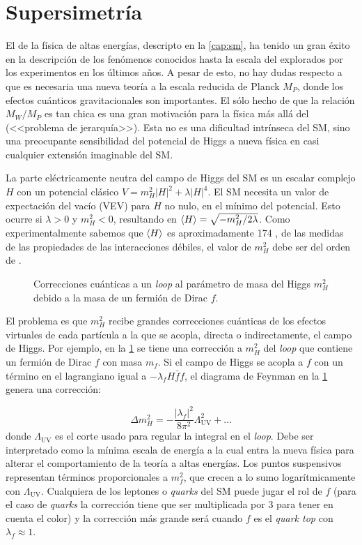 \section{Supersimetría}
\label{cap:susy}

El {\SM} de la física de altas energías, descripto en la \cref{cap:sm}, ha
tenido un gran éxito en la descripción de los fenómenos conocidos hasta la
escala del {\tev} explorados por los experimentos en los últimos a\~nos. A pesar
de esto, no hay dudas respecto a que es necesaria una nueva teoría a la escala
reducida de Planck $M_P$, donde los efectos cuánticos gravitacionales son
importantes. El sólo hecho de que la relación $M_W/M_P$ es tan chica es una
gran motivación para la física más allá del {\SM} (<<problema de jerarquía>>).
Esta no es una dificultad intrínseca del SM, sino una
preocupante sensibilidad del potencial de Higgs a nueva física en casi cualquier
extensión imaginable del SM.

La parte eléctricamente neutra del campo de Higgs del SM es un escalar complejo
$H$ con un potencial clásico $V=m_H^2 |H|^2 + \lambda|H|^4$. El SM necesita un
valor de expectación del vacío (VEV) para $H$ no nulo, en el mínimo del potencial.
Esto ocurre si $\lambda>0$ y $m_H^2<0$, resultando en $\langle H \rangle = \sqrt{-m_H^2/2\lambda}$.
Como experimentalmente sabemos que $\langle H \rangle$ es
aproximadamente 174 \gev, de las medidas de las propiedades de las interacciones
débiles, el valor de $m_H^2$ debe ser del orden de .

\begin{figure}[!h]
  \centering 
  \caption{Correcciones cuánticas a un \emph{loop} al parámetro de masa del Higgs
    $m_H^2$ debido a la masa de un fermión de Dirac $f$.}
  \label{fig:higgs_corr_f}
\end{figure}

El problema es que $m_H^2$ recibe grandes correcciones cuánticas de los efectos
virtuales de cada partícula a la que se acopla, directa o indirectamente, el
campo de Higgs. Por ejemplo, en la \cref{fig:higgs_corr_f} se tiene una
corrección a $m_H^2$ del \emph{loop} que contiene un fermión de Dirac $f$ con masa
$m_f$. Si el campo de Higgs se acopla a $f$ con un término en el lagrangiano
igual a $-\lambda_f H \bar{f}f$, el diagrama de Feynman en la \cref{fig:higgs_corr_f} genera una corrección:

\begin{equation}
  \Delta m_H^2 = -\frac{|\lambda_f|^2}{8\pi^2} \Lambda^2_{\text{UV}} + \ldots
  \label{eq:higgs_corr_f}
\end{equation}
%
donde $\Lambda_\text{UV}$ es el corte usado para regular la integral en el
\emph{loop}. Debe ser interpretado como la mínima escala de energía a la
cual entra la nueva física para alterar el comportamiento de la teoría a altas
energías. Los puntos suspensivos representan términos proporcionales a $m_f^2$,
que crecen a lo sumo logarítmicamente con $\Lambda_\text{UV}$. Cualquiera de los
leptones o \emph{quarks} del SM puede jugar el rol de $f$ (para el caso de \emph{quarks} la
corrección tiene que ser multiplicada por 3 para tener en cuenta el color) y
la corrección más grande será cuando $f$ es el \emph{quark top} con
$\lambda_f \approx 1$.

